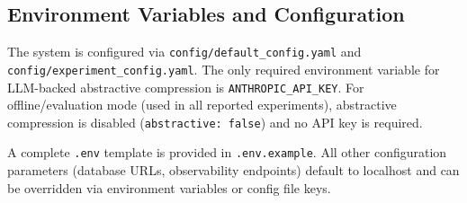 \subsection{Environment Variables and Configuration}

The system is configured via \texttt{config/default\_config.yaml} and
\texttt{config/experiment\_config.yaml}.  The only required environment
variable for LLM-backed abstractive compression is
\texttt{ANTHROPIC\_API\_KEY}.  For offline/evaluation mode (used in all
reported experiments), abstractive compression is disabled
(\texttt{abstractive: false}) and no API key is required.

A complete \texttt{.env} template is provided in \texttt{.env.example}.
All other configuration parameters (database URLs, observability endpoints)
default to localhost and can be overridden via environment variables or
config file keys.
